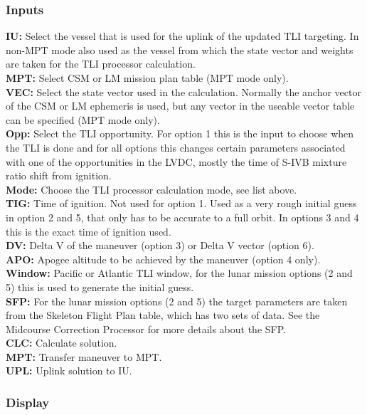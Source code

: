 \documentclass[11pt]{article} %
\begin{document}
\subsubsection{Inputs}
\textbf{IU:} Select the vessel that is used for the uplink of the updated TLI targeting. In non-MPT mode also used as the vessel from which the state vector and weights are taken for the TLI processor calculation.\\
\textbf{MPT:} Select CSM or LM mission plan table (MPT mode only).\\
\textbf{VEC:} Select the state vector used in the calculation. Normally the anchor vector of the CSM or LM ephemeris is used, but any vector in the useable vector table can be specified (MPT mode only).\\
\textbf{Opp:} Select the TLI opportunity. For option 1 this is the input to choose when the TLI is done and for all options this changes certain parameters associated with one of the opportunities in the LVDC, mostly the time of S-IVB mixture ratio shift from ignition.\\
\textbf{Mode:} Choose the TLI processor calculation mode, see list above.\\
\textbf{TIG:} Time of ignition. Not used for option 1. Used as a very rough initial guess in option 2 and 5, that only has to be accurate to a full orbit. In options 3 and 4 this is the exact time of ignition used.\\
\textbf{DV:} Delta V of the maneuver (option 3) or Delta V vector (option 6).\\
\textbf{APO:} Apogee altitude to be achieved by the maneuver (option 4 only).\\
\textbf{Window:} Pacific or Atlantic TLI window, for the lunar mission options (2 and 5) this is used to generate the initial guess.\\
\textbf{SFP:} For the lunar mission options (2 and 5) the target parameters are taken from the Skeleton Flight Plan table, which has two sets of data. See the Midcourse Correction Processor for more details about the SFP.\\

\textbf{CLC:} Calculate solution.\\
\textbf{MPT:} Transfer maneuver to MPT.\\
\textbf{UPL:} Uplink solution to IU.\\
\newpage
\subsubsection{Display}
\end{document}
